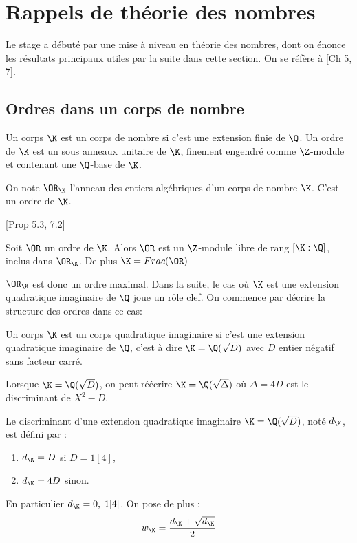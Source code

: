 \section{Rappels de théorie des nombres}

 Le stage a débuté par une mise à niveau en théorie des nombres, dont on énonce les résultats principaux utiles par la suite dans cette section. On se réfère à \cite{Cox}[Ch 5, 7].

\subsection{Ordres dans un corps de nombre}

\begin{Def}
	
	Un corps $\K$ est un corps de nombre si c'est une extension finie de $\Q$. Un ordre de $\K$ est un sous anneaux unitaire de $\K$, finement engendré comme $\Z$-module et contenant une $\Q$-base de $\K$.
\end{Def}

\begin{Ex}
	On note $\OR_{\K}$ l'anneau des entiers algébriques d'un corps de nombre $\K$. C'est un ordre de $\K$.
\end{Ex}

\begin{Prop}\cite{Cox}[Prop 5.3, 7.2]
	
	Soit $\OR$ un ordre de $\K$. Alors $\OR$ est un $\Z$-module libre de rang $\left[ \K : \Q\right] $, inclus dans $\OR_{\K}$.
	De plus $\K = Frac(\OR)$
\end{Prop}

$\OR_{\K}$ est donc un ordre maximal. Dans la suite, le cas où $\K$ est une extension quadratique imaginaire de $\Q$ joue un rôle clef. On commence par décrire la structure des ordres dans ce cas:

\begin{Def}
	Un corps $\K$ est un corps quadratique imaginaire si c'est une extension quadratique imaginaire de $\Q$, c'est à dire $\K = \Q(\sqrt{D})$ avec $D$ entier négatif sans facteur carré. 
\end{Def}

Lorsque $\K = \Q(\sqrt{D})$, on peut réécrire $\K = \Q(\sqrt{\Delta})$ où $\Delta = 4D$ est le discriminant de $X^{2} - D$. 

\begin{Def}
	Le discriminant d'une extension quadratique imaginaire $\K = \Q(\sqrt{D})$, noté $d_{\K}$, est défini par :
	\begin{enumerate}
		\item $d_{\K} = D$ si $D = 1 [4]$,
		\item $d_{\K} = 4D$ sinon.
	\end{enumerate}
	En particulier $d_{\K} = 0 ,\;1[4]$. On pose de plus :
	\begin{equation*}
		w_{\K} = \frac{d_{\K} + \sqrt{d_{\K}}}{2}
	\end{equation*}
\end{Def}


